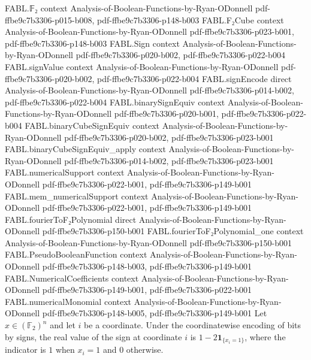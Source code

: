 \begin{theorem}
\label{FABL.signValue_binaryCubeSignEquiv_eq_one_sub_two}
\leanok
{}
\proofstep
  {FABL.𝔽₂}
  {context}
  {Analysis-of-Boolean-Functions-by-Ryan-ODonnell}
  {pdf-ffbe9c7b3306-p015-b008,
    pdf-ffbe9c7b3306-p148-b003}
\proofstep
  {FABL.F₂Cube}
  {context}
  {Analysis-of-Boolean-Functions-by-Ryan-ODonnell}
  {pdf-ffbe9c7b3306-p023-b001,
    pdf-ffbe9c7b3306-p148-b003}
\proofstep
  {FABL.Sign}
  {context}
  {Analysis-of-Boolean-Functions-by-Ryan-ODonnell}
  {pdf-ffbe9c7b3306-p020-b002,
    pdf-ffbe9c7b3306-p022-b004}
\proofstep
  {FABL.signValue}
  {context}
  {Analysis-of-Boolean-Functions-by-Ryan-ODonnell}
  {pdf-ffbe9c7b3306-p020-b002,
    pdf-ffbe9c7b3306-p022-b004}
\proofstep
  {FABL.signEncode}
  {direct}
  {Analysis-of-Boolean-Functions-by-Ryan-ODonnell}
  {pdf-ffbe9c7b3306-p014-b002,
    pdf-ffbe9c7b3306-p022-b004}
\proofstep
  {FABL.binarySignEquiv}
  {context}
  {Analysis-of-Boolean-Functions-by-Ryan-ODonnell}
  {pdf-ffbe9c7b3306-p020-b001,
    pdf-ffbe9c7b3306-p022-b004}
\proofstep
  {FABL.binaryCubeSignEquiv}
  {context}
  {Analysis-of-Boolean-Functions-by-Ryan-ODonnell}
  {pdf-ffbe9c7b3306-p020-b002,
    pdf-ffbe9c7b3306-p023-b001}
\proofstep
  {FABL.binaryCubeSignEquiv_apply}
  {context}
  {Analysis-of-Boolean-Functions-by-Ryan-ODonnell}
  {pdf-ffbe9c7b3306-p014-b002,
    pdf-ffbe9c7b3306-p023-b001}
\proofstep
  {FABL.numericalSupport}
  {context}
  {Analysis-of-Boolean-Functions-by-Ryan-ODonnell}
  {pdf-ffbe9c7b3306-p022-b001,
    pdf-ffbe9c7b3306-p149-b001}
\proofstep
  {FABL.mem_numericalSupport}
  {context}
  {Analysis-of-Boolean-Functions-by-Ryan-ODonnell}
  {pdf-ffbe9c7b3306-p022-b001,
    pdf-ffbe9c7b3306-p149-b001}
\proofstep
  {FABL.fourierToF₂Polynomial}
  {direct}
  {Analysis-of-Boolean-Functions-by-Ryan-ODonnell}
  {pdf-ffbe9c7b3306-p150-b001}
\proofstep
  {FABL.fourierToF₂Polynomial_one}
  {context}
  {Analysis-of-Boolean-Functions-by-Ryan-ODonnell}
  {pdf-ffbe9c7b3306-p150-b001}
\proofstep
  {FABL.PseudoBooleanFunction}
  {context}
  {Analysis-of-Boolean-Functions-by-Ryan-ODonnell}
  {pdf-ffbe9c7b3306-p148-b003,
    pdf-ffbe9c7b3306-p149-b001}
\proofstep
  {FABL.NumericalCoefficients}
  {context}
  {Analysis-of-Boolean-Functions-by-Ryan-ODonnell}
  {pdf-ffbe9c7b3306-p149-b001,
    pdf-ffbe9c7b3306-p022-b001}
\proofstep
  {FABL.numericalMonomial}
  {context}
  {Analysis-of-Boolean-Functions-by-Ryan-ODonnell}
  {pdf-ffbe9c7b3306-p148-b005,
    pdf-ffbe9c7b3306-p149-b001}
Let $x\in(\mathbb F_2)^n$ and let $i$ be a coordinate. Under the coordinatewise encoding
of bits by signs, the real value of the sign at coordinate $i$ is $1-2\mathbf
1_{\{x_i=1\}}$, where the indicator is $1$ when $x_i=1$ and $0$ otherwise.
\end{theorem}

